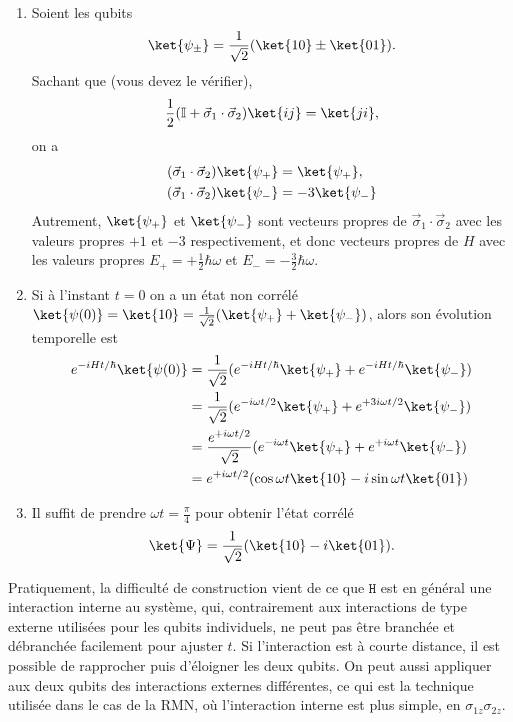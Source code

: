 \begin{example}
\begin{enumerate}
\item Soient les qubits%
\begin{equation}
\ket{\psi_\pm}=\frac{1}{\sqrt{2}}(\ket{10}\pm\ket{01} ).
\end{equation}
Sachant que (vous devez le vérifier),%
\begin{equation}
\frac{1}{2}(\mathbb{I}+\vec{\sigma}_{1}\cdot\vec{\sigma}_{2})\ket{ij}
=\ket{ji},
\end{equation}
on a%
\begin{equation}
\begin{split}
(\vec{\sigma}_{1}\cdot\vec{\sigma}_{2})\ket{\psi_{+}} & =\ket{\psi_{+}},\\
(\vec{\sigma}_{1}\cdot\vec{\sigma}_{2})\ket{\psi_{-}} &
=-3\ket{\psi_{-}}
\end{split}
\end{equation}
Autrement, $\ket{\psi_{+}}$ et $\ket{\psi_{-}}$ sont vecteurs propres de
$\vec{\sigma}_{1}\cdot\vec{\sigma}_{2}$ avec les valeurs propres $+1$ et $-3$
respectivement, et donc vecteurs propres de $H$ avec les valeurs propres
$E_{+}=+\frac{1}{2}\hbar\omega$ et $E_{-}=-\frac{3}{2}\hbar\omega$.

\item Si à l'instant $t=0$ on a un état non corrélé $\ket{\psi(0)}=\ket{10}
=\frac{1}{\sqrt{2}}(\ket{\psi_{+}}+\ket{\psi_{-}})$, alors son évolution
temporelle est%
\begin{equation}
\begin{split}
e^{-iHt/\hbar}\ket{\psi(0)}&  =\frac{1}{\sqrt{2}}(e^{-iHt/\hbar}\ket{\psi_{+}}
+e^{-iHt/\hbar}\ket{\psi_{-}})\\
&  =\frac{1}{\sqrt{2}}(e^{-i\omega t/2}\ket{\psi_{+}}+e^{+3i\omega t/2}
\ket{\psi_{-}})\\
&  =\frac{e^{+i\omega t/2}}{\sqrt{2}}(e^{-i\omega t}\ket{\psi_{+}}+e^{+i\omega
t}\ket{\psi_{-}})\\
&  =e^{+i\omega t/2}(\cos\omega t\ket{10} -i\sin\omega t\ket{01})
\end{split}
\end{equation}


\item Il suffit de prendre $\omega t=\frac{\pi}{4}$ pour obtenir l'état corrélé%
\begin{equation}
\ket{\Psi}=\frac{1}{\sqrt{2}}(\ket{10}
-i\ket{01} ).
\end{equation}
\end{enumerate}

Pratiquement, la difficulté de construction vient de ce que $\mathtt{H}$ est en
général une interaction interne au système, qui, contrairement aux interactions
de type externe utilisées pour les qubits individuels, ne peut pas être branchée
et débranchée facilement pour ajuster $t$. Si l'interaction est à courte
distance, il est possible de rapprocher puis d'éloigner les deux qubits. On peut
aussi appliquer aux deux qubits des interactions externes différentes, ce qui
est la technique utilisée dans le cas de la RMN, où l'interaction interne est
plus simple, en $\sigma_{1z}\sigma_{2z}$.
\end{example}

